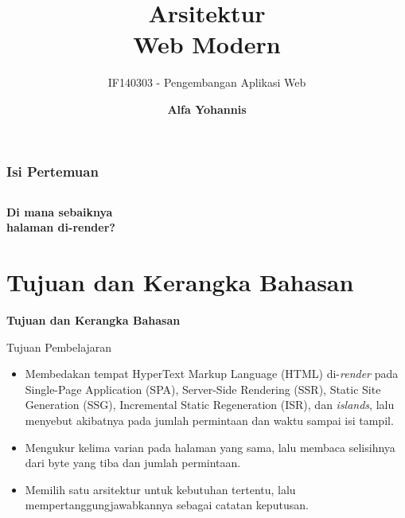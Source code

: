 \documentclass[aspectratio=169, table, 12pt]{beamer}
\title{\Huge Arsitektur\\ \vspace{10pt} Web Modern}
\subtitle{IF140303 - Pengembangan Aplikasi Web}
\author{\textbf{Alfa Yohannis}}
\begin{document}
\frame{\titlepage}

\begin{frame}[fragile]
  \frametitle{Isi Pertemuan}
  \vspace{14pt}
  \begin{columns}[t]
    {\small\tableofcontents[sections={1-7}]}

    {\small\tableofcontents[sections={8-14}]}
  \end{columns}
\end{frame}

\begin{frame}{\hfill}
  \centering
  \Huge{\textbf{Di mana sebaiknya\\halaman di-render?}}
\end{frame}

\section{Tujuan dan Kerangka Bahasan}

\begin{frame}{\hfill}
  \centering
  \Huge{\textbf{Tujuan dan Kerangka Bahasan}}
\end{frame}

\begin{frame}{{\Large Tujuan Pembelajaran}}
  \vspace{10pt}
  \begin{itemize}
    \item Membedakan tempat HyperText Markup Language (HTML) di-\textit{render} pada Single-Page Application (SPA), Server-Side Rendering (SSR), Static Site Generation (SSG), Incremental Static Regeneration (ISR), dan
          \textit{islands}, lalu menyebut akibatnya pada jumlah permintaan
          dan waktu sampai isi tampil.
    \item Mengukur kelima varian pada halaman yang sama, lalu membaca
          selisihnya dari byte yang tiba dan jumlah permintaan.
    \item Memilih satu arsitektur untuk kebutuhan tertentu, lalu
          mempertanggungjawabkannya sebagai catatan keputusan.
  \end{itemize}
\end{frame}
\end{document}
